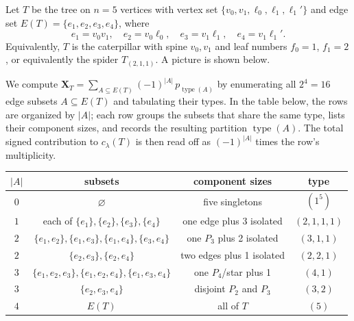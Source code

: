 \documentclass[11pt]{article}
\theoremstyle{definition}
\newcommand{\X}{\mathbf{X}}
\newcommand{\type}{\operatorname{type}}
\begin{document}
Let $T$ be the tree on $n=5$ vertices with vertex set
$\{v_0,v_1,\ell_0,\ell_1,\ell_1'\}$ and edge set
$E(T) = \{e_1,e_2,e_3,e_4\}$, where
\[
   e_1 = v_0v_1,\quad
   e_2 = v_0\ell_0,\quad
   e_3 = v_1\ell_1,\quad
   e_4 = v_1\ell_1'.
\]
Equivalently, $T$ is the caterpillar with spine $v_0,v_1$ and leaf
numbers $f_0=1$, $f_1=2$, or equivalently the spider $T_{(2,1,1)}$.
A picture is shown below.

\begin{center}
\end{center}

We compute $\X_T = \sum_{A\subseteq E(T)} (-1)^{|A|}\,p_{\type(A)}$ by
enumerating all $2^4=16$ edge subsets $A\subseteq E(T)$ and tabulating
their types.  In the table below, the rows are organized by $|A|$;
each row groups the subsets that share the same type, lists their
component sizes, and records the resulting partition $\type(A)$.  The
total signed contribution to $c_\lambda(T)$ is then read off as
$(-1)^{|A|}$ times the row's multiplicity.

\begin{center}
\begin{tabular}{c|c|c|c}
$|A|$ & subsets & component sizes & type \\\hline
$0$  & $\varnothing$
     & five singletons          & $(1^5)$ \\
$1$  & each of $\{e_1\},\{e_2\},\{e_3\},\{e_4\}$
     & one edge plus 3 isolated   & $(2,1,1,1)$ \\
$2$  & $\{e_1,e_2\},\{e_1,e_3\},\{e_1,e_4\},\{e_3,e_4\}$
     & one $P_3$ plus 2 isolated  & $(3,1,1)$ \\
$2$  & $\{e_2,e_3\},\{e_2,e_4\}$
     & two edges plus 1 isolated  & $(2,2,1)$ \\
$3$  & $\{e_1,e_2,e_3\},\{e_1,e_2,e_4\},\{e_1,e_3,e_4\}$
     & one $P_4$/star plus 1      & $(4,1)$ \\
$3$  & $\{e_2,e_3,e_4\}$
     & disjoint $P_2$ and $P_3$   & $(3,2)$ \\
$4$  & $E(T)$
     & all of $T$                 & $(5)$ \\
\end{tabular}
\end{center}
\end{document}

